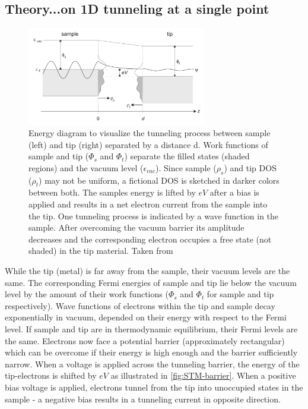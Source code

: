 \subsection{Theory...on 1D tunneling at a single point}

\begin{figure}[]\centering
	\includegraphics[width=0.7\textwidth]{./images/tunnel-barrier}
	\caption{Energy diagram to visualize the tunneling process between sample (left) and tip (right) separated by a distance d. Work functions of sample and tip ($\Phi_s$ and $\Phi_t$) separate the filled states (shaded regions) and the vacuum level ($\epsilon_{vac}$). Since sample ($\rho_s$) and tip DOS ($\rho_t$) may not be uniform, a fictional DOS is sketched in darker colors between both. The samples energy is lifted by $eV$ after a bias is applied and results in a net electron current from the sample into the tip. One tunneling process is indicated by a wave function in the sample. After overcoming the vacuum barrier its amplitude decreases and the corresponding electron occupies a free state (not shaded) in the tip material.  Taken from \cite{diss-schunack}}
	\label{fig:STM-barrier}
\end{figure}

While the tip (metal) is far away from the sample, their vacuum levels are the same. The corresponding Fermi energies of sample and tip lie below the vacuum level by the amount of their work functions ($\Phi_s$ and $\Phi_t$ for sample and tip respectively). Wave functions of electrons within the tip and sample decay exponentially in vacuum, depended on their energy with respect to the Fermi level.
If sample and tip are in thermodynamic equilibrium, their Fermi levels are the same. Electrons now face a potential barrier (approximately rectangular) which can be overcome if their energy is high enough and the barrier sufficiently narrow. When a voltage is applied across the tunneling barrier, the energy of the tip-electrons is shifted by $eV$ as illustrated in \autoref{fig:STM-barrier}. When a positive bias voltage is applied, electrons tunnel from the tip into unoccupied states in the sample - a negative bias results in a tunneling current in opposite direction. 

